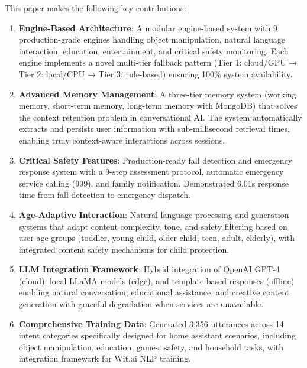 \documentclass[conference]{IEEEtran}
\begin{document}
This paper makes the following key contributions:

\begin{enumerate}
    \item \textbf{Engine-Based Architecture}: A modular engine-based system with 9 production-grade engines handling object manipulation, natural language interaction, education, entertainment, and critical safety monitoring. Each engine implements a novel multi-tier fallback pattern (Tier 1: cloud/GPU → Tier 2: local/CPU → Tier 3: rule-based) ensuring 100\% system availability.
    
    \item \textbf{Advanced Memory Management}: A three-tier memory system (working memory, short-term memory, long-term memory with MongoDB) that solves the context retention problem in conversational AI. The system automatically extracts and persists user information with sub-millisecond retrieval times, enabling truly context-aware interactions across sessions.
    
    \item \textbf{Critical Safety Features}: Production-ready fall detection and emergency response system with a 9-step assessment protocol, automatic emergency service calling (999), and family notification. Demonstrated 6.01s response time from fall detection to emergency dispatch.
    
    \item \textbf{Age-Adaptive Interaction}: Natural language processing and generation systems that adapt content complexity, tone, and safety filtering based on user age groups (toddler, young child, older child, teen, adult, elderly), with integrated content safety mechanisms for child protection.
    
    \item \textbf{LLM Integration Framework}: Hybrid integration of OpenAI GPT-4 (cloud), local LLaMA models (edge), and template-based responses (offline) enabling natural conversation, educational assistance, and creative content generation with graceful degradation when services are unavailable.
    
    \item \textbf{Comprehensive Training Data}: Generated 3,356 utterances across 14 intent categories specifically designed for home assistant scenarios, including object manipulation, education, games, safety, and household tasks, with integration framework for Wit.ai NLP training.
\end{enumerate}
\end{document}
